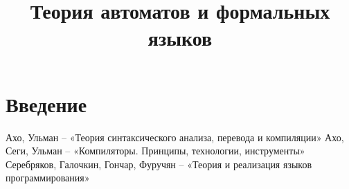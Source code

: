 \documentclass[a4paper]{report}
\title{Теория автоматов и формальных языков}
\begin{document}
\maketitle
\tableofcontents
\newpage

\chapter{Введение}




\begin{thebibliography}{}
      Ахо, Ульман  --  «Теория синтаксического анализа, перевода и компиляции»
      Ахо, Сеги, Ульман  --  «Компиляторы. Принципы, технологии, инструменты»
      Серебряков, Галочкин, Гончар, Фуручян  --  «Теория и реализация языков программирования»
\end{thebibliography}
\end{document}
